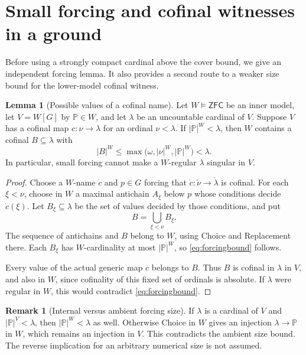 \documentclass[11pt,letterpaper]{article}
\theoremstyle{definition}
\newtheorem{lemma}[definition]{Lemma}
\newcommand{\ZFC}{\mathsf{ZFC}}
\newtheorem{remark}[definition]{Remark}
\numberwithin{equation}{section}
\begin{document}
\section{Small forcing and cofinal witnesses in a ground}\label{sec:forcing}

Before using a strongly compact cardinal above the cover bound, we give an independent forcing lemma. It also provides a second route to a weaker size bound for the lower-model cofinal witness.

\begin{lemma}[Possible values of a cofinal name]\label{lem:forcing}
Let $W\models\ZFC$ be an inner model, let $V=W[G]$ by $\mathbb P\in W$, and let $\lambda$ be an uncountable cardinal of $V$. Suppose $V$ has a cofinal map $c:\nu\to\lambda$ for an ordinal $\nu<\lambda$. If $|\mathbb P|^W<\lambda$, then $W$ contains a cofinal $B\subseteq\lambda$ with
\begin{equation}\label{eq:forcingbound}
 |B|^W\leq\max\bigl(\omega,|\nu|^W,|\mathbb P|^W\bigr)<\lambda.
\end{equation}
In particular, small forcing cannot make a $W$-regular $\lambda$ singular in $V$.
\end{lemma}

\begin{proof}
Choose a $W$-name $\dot c$ and $p\in G$ forcing that $\dot c:\check\nu\to\check\lambda$ is cofinal. For each $\xi<\nu$, choose in $W$ a maximal antichain $A_\xi$ below $p$ whose conditions decide $\dot c(\xi)$. Let $B_\xi\subseteq\lambda$ be the set of values decided by those conditions, and put
\[
 B=\bigcup_{\xi<\nu}B_\xi.
\]
The sequence of antichains and $B$ belong to $W$, using Choice and Replacement there. Each $B_\xi$ has $W$-cardinality at most $|\mathbb P|^W$, so \eqref{eq:forcingbound} follows.

Every value of the actual generic map $c$ belongs to $B$. Thus $B$ is cofinal in $\lambda$ in $V$, and also in $W$, since cofinality of this fixed set of ordinals is absolute. If $\lambda$ were regular in $W$, this would contradict \eqref{eq:forcingbound}.
\end{proof}

\begin{remark}[Internal versus ambient forcing size]\label{rem:size}
If $\lambda$ is a cardinal of $V$ and $|\mathbb P|^V<\lambda$, then $|\mathbb P|^W<\lambda$ as well. Otherwise Choice in $W$ gives an injection $\lambda\to\mathbb P$ in $W$, which remains an injection in $V$. This contradicts the ambient size bound. The reverse implication for an arbitrary numerical size is not assumed.
\end{remark}
\end{document}
